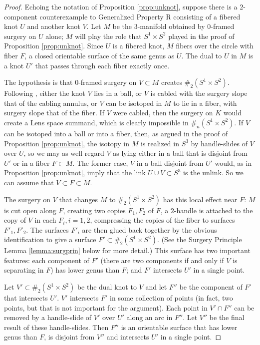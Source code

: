 \documentclass{amsart}
\begin{document}
\begin{proof}  Echoing the notation of Proposition \ref{prop:unknot}, suppose there is a $2$-component counterexample to Generalized Property R consisting of a fibered knot $U$ and another knot $V$.  Let $M$ be the $3$-manifold obtained by $0$-framed surgery on $U$ alone; $M$ will play the role that $S^1 \times S^2$ played in the proof of Proposition \ref{prop:unknot}.  Since $U$ is a fibered knot, $M$ fibers over the circle with fiber $F$, a closed orientable surface of the same genus as $U$.  The dual to $U$ in $M$ is a knot $U'$ that passes through each fiber exactly once.

The hypothesis is that $0$-framed surgery on $V \subset M$ creates $\#_{2} (S^{1} \times S^{2})$.  Following  \cite[Corollary 4.2]{ST}, either  the knot $V$ lies in a ball, or $V$ is cabled with the surgery slope that of the cabling annulus, or $V$ can be isotoped in $M$ to lie in a fiber, with surgery slope that of the fiber.  If $V$ were cabled, then the surgery on $K$ would create a Lens space summand, which is clearly impossible in $\#_{n} (S^{1} \times S^{2})$.  If $V$ can be isotoped into a ball or into a fiber, then, as argued in the proof of Proposition \ref{prop:unknot}, the isotopy in $M$ is realized in $S^3$ by handle-slides of $V$ over $U$, so we may as well regard $V$ as lying either in a ball that is disjoint from $U'$ or in a fiber $F \subset M$.  The former case, $V$ in a ball disjoint from $U'$ would, as in Proposition \ref{prop:unknot}, imply that the link $U \cup V \subset S^3$ is the unlink.  So we can assume that $V \subset F \subset M$.

The surgery on $V$ that changes $M$ to $\#_{2} (S^{1} \times S^{2})$ has this local effect near $F$:  $M$ is cut open along $F$, creating two copies $F_1, F_2$ of $F$, a $2$-handle is attached to  the copy of $V$ in each $F_i, i = 1, 2$, compressing the copies of the fiber to surfaces $F'_1, F'_2$.  The surfaces $F'_i$ are then glued back together by the obvious identification to give a surface $F' \subset \#_{2} (S^{1} \times S^{2})$. (See the Surgery Principle Lemma \ref{lemma:surgprin} below for more detail.)   This surface has two important features:  each component of $F'$ (there are two components if and only if $V$ is separating in $F$) has lower genus than $F$; and $F'$ intersects $U'$ in a single point.

Let $V' \subset \#_{2} (S^{1} \times S^{2})$ be the dual knot to $V$ and let $F''$ be the component of $F'$ that intersects $U'$.  $V'$ intersects $F'$ in some collection of points (in fact, two points, but that is not important for the argument).  Each point in $V' \cap F''$ can be removed by a handle-slide of $V'$ over $U'$ along an arc in $F''$.  Let $V''$ be the final result of these handle-slides.  Then $F''$ is an orientable surface that has lower genus than $F$, is disjoint from $V''$ and intersects $U'$ in a single point.


\end{proof}
\end{document}
